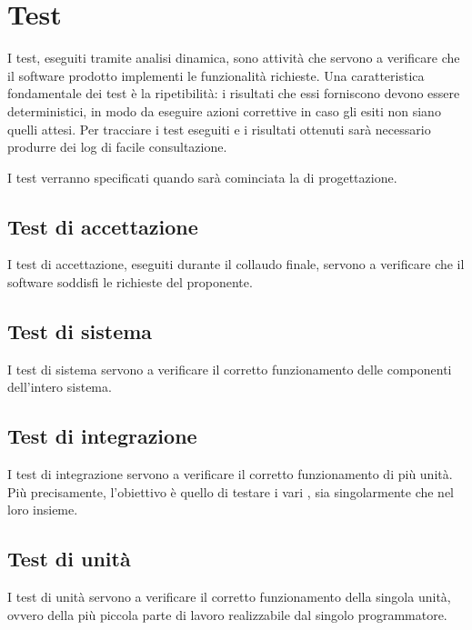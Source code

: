 \newpage

\section{Test}
	I test, eseguiti tramite analisi dinamica, sono attività che servono a verificare che il software prodotto implementi le funzionalità richieste. Una caratteristica fondamentale dei test è la ripetibilità: i risultati che essi forniscono devono essere deterministici, in modo da eseguire azioni correttive in caso gli esiti non siano quelli attesi.
	Per tracciare i test eseguiti e i risultati ottenuti sarà necessario produrre dei log di facile consultazione.
	
	I test verranno specificati quando sarà cominciata la  di progettazione.
	
	\subsection{Test di accettazione}
		I test di accettazione, eseguiti durante il collaudo finale, servono a verificare che il software soddisfi le richieste del proponente.
		
	\subsection{Test di sistema}
		I test di sistema servono a verificare il corretto funzionamento delle componenti dell'intero sistema.
		
	\subsection{Test di integrazione}
		I test di integrazione servono a verificare il corretto funzionamento di più unità. Più precisamente, l'obiettivo è quello di testare i vari , sia singolarmente che nel loro insieme.
		
	\subsection{Test di unità}
		I test di unità servono a verificare il corretto funzionamento della singola unità, ovvero della più piccola parte di lavoro realizzabile dal singolo programmatore.